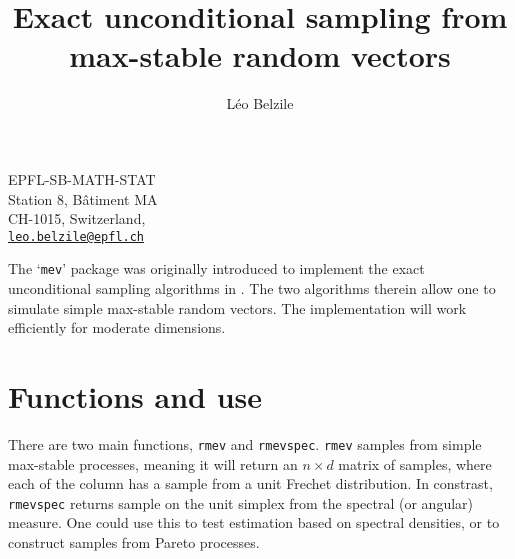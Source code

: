 \documentclass{article}
\newcommand{\code}[1]{\texttt{#1}}
\begin{document}


\title{Exact unconditional sampling from max-stable random vectors}
\author{Léo Belzile}
\date{}
\maketitle
\begin{center}
{ \small
EPFL-SB-MATH-STAT \\ Station 8, Bâtiment MA \\CH-1015, Switzerland,\\ \href{leo.belzile@epfl.ch}{\texttt{leo.belzile@epfl.ch}}
}
\end{center}

The `\code{mev}' package was originally introduced to implement the exact unconditional sampling algorithms in \cite{Dombry:2016}. The two algorithms therein allow one to simulate simple max-stable random vectors. The implementation will work efficiently for moderate dimensions.

\section{Functions and use}

There are two main functions, \code{rmev} and \code{rmevspec}. \code{rmev} samples from simple max-stable processes, meaning it will return an $n \times d$ matrix of samples, where each of the column has a sample from a unit Frechet distribution. In constrast, \code{rmevspec} returns sample on the unit simplex from the spectral (or angular) measure. One could use this to test estimation based on spectral densities, or to construct samples from Pareto processes.
\end{document}
